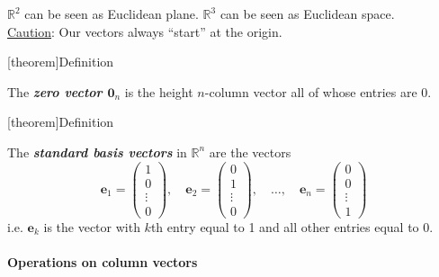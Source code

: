 \documentclass[12pt]{report}
\theoremstyle{definition}
\begin{document}
\begin{ex}
    $\mathbb{R}^{2}$ can be seen as Euclidean plane. $\mathbb{R}^{3}$ can be seen as Euclidean space.
    \\\underline{Caution}: Our vectors always ``start'' at the origin.
\end{ex}

[theorem]{Definition}
\begin{zero vector}
    The \textbf{\emph{zero vector $\pmb{0}_n$}} is the height $n$-column vector all of whose entries are 0.
\end{zero vector}


[theorem]{Definition}
\begin{standard basis vector}
    The \textbf{\emph{standard basis vectors}} in $\mathbb{R}^{n}$ are the vectors\[
        \pmb{e}_1 = \begin{pmatrix}
                1\\
                0\\
                \vdots\\
                0
        \end{pmatrix}, \quad
        \pmb{e}_2 = \begin{pmatrix}
                0\\
                1\\
                \vdots\\
                0
        \end{pmatrix}, \quad \ldots, \quad
        \pmb{e}_n = \begin{pmatrix}
                0\\
                0\\
                \vdots\\
                1
        \end{pmatrix}
    \]
    i.e. $\pmb{e}_k$ is the vector with $k$th entry equal to 1 and all other entries equal to 0.
\end{standard basis vector}

\paragraph{Operations on column vectors}
\end{document}
